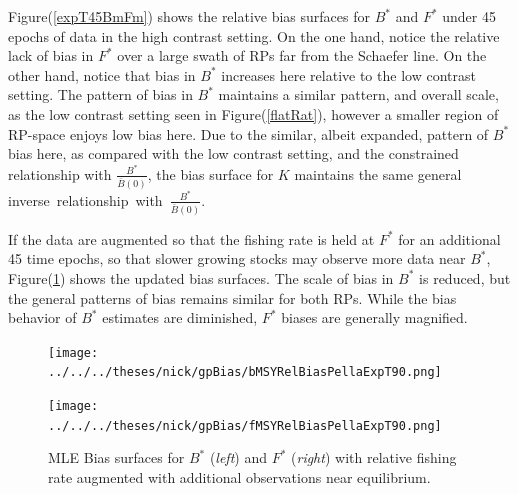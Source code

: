 \documentclass[12pt]{article}
\begin{document}
%
Figure(\ref{expT45BmFm}) shows the relative bias surfaces for $B^*$ and $F^*$ 
under 45 epochs of data in the high contrast setting. On the one hand, notice 
the relative lack of bias in $F^*$ over a large swath of RPs far from the 
Schaefer line. On the other hand, notice that bias in $B^*$ increases here 
relative to the low contrast setting. The pattern of bias in $B^*$ %
maintains a similar pattern, and overall scale, as the low contrast setting 
seen in Figure(\ref{flatRat}), however a smaller region of RP-space enjoys low 
bias here. Due to the similar, albeit expanded, pattern of $B^*$ bias here, as 
compared with the low contrast setting, and the constrained relationship with 
$\frac{B^*}{\bar B(0)}$, the bias surface for $K$ maintains the same general 
\mbox{inverse relationship with $\frac{B^*}{\bar B(0)}$.}

%
If the data are augmented so that the fishing rate is held at $F^*$ for an 
additional 45 time epochs, so that slower growing stocks may observe more data 
near $B^*$, Figure(\ref{expT90BmFm}) shows the updated bias surfaces. The scale
of bias in $B^*$ is reduced, but the general patterns of bias remains 
similar for both RPs. While the bias behavior of $B^*$ estimates are diminished, 
$F^*$ biases are generally magnified.  

%

%
\begin{figure}[h!]
\begin{minipage}[h!]{0.49\textwidth}
%
\texttt{[image: ../../../theses/nick/gpBias/bMSYRelBiasPellaExpT90.png]}
\end{minipage}
\begin{minipage}[h!]{0.49\textwidth}
\texttt{[image: ../../../theses/nick/gpBias/fMSYRelBiasPellaExpT90.png]}
\end{minipage}
\caption{\label{expT90BmFm}
MLE Bias surfaces for $B^*$ (\emph{left}) and $F^*$ (\emph{right}) with relative fishing rate augmented with additional observations near equilibrium.
}
\end{figure}

%
\end{document}

